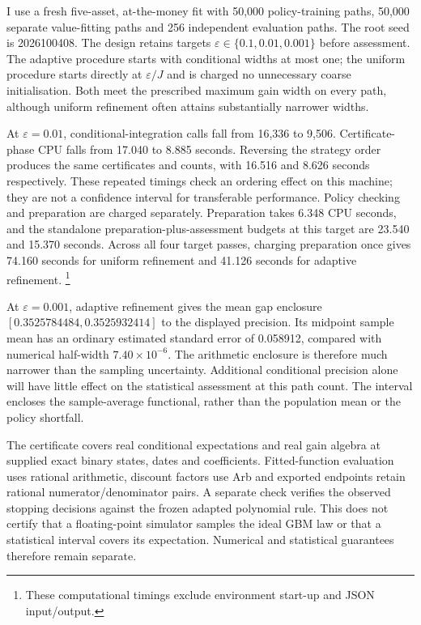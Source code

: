 \documentclass[11pt]{article}
\begin{document}
I use a fresh five-asset, at-the-money fit with 50,000 policy-training paths, 50,000 separate value-fitting paths and 256 independent evaluation paths. The root seed is 2026100408. The design retains targets $\varepsilon\in\{0.1,0.01,0.001\}$ before assessment. The adaptive procedure starts with conditional widths at most one; the uniform procedure starts directly at $\varepsilon/J$ and is charged no unnecessary coarse initialisation. Both meet the prescribed maximum gain width on every path, although uniform refinement often attains substantially narrower widths.

At $\varepsilon=0.01$, conditional-integration calls fall from 16,336 to 9,506. Certificate-phase CPU falls from 17.040 to 8.885 seconds. Reversing the strategy order produces the same certificates and counts, with 16.516 and 8.626 seconds respectively. These repeated timings check an ordering effect on this machine; they are not a confidence interval for transferable performance. Policy checking and preparation are charged separately. Preparation takes 6.348 CPU seconds, and the standalone preparation-plus-assessment budgets at this target are 23.540 and 15.370 seconds. Across all four target passes, charging preparation once gives 74.160 seconds for uniform refinement and 41.126 seconds for adaptive refinement. \footnote{These computational timings exclude environment start-up and JSON input/output.}

At $\varepsilon=0.001$, adaptive refinement gives the mean gap enclosure $[0.3525784484,\allowbreak 0.3525932414]$ to the displayed precision. Its midpoint sample mean has an ordinary estimated standard error of 0.058912, compared with numerical half-width $7.40\times10^{-6}$. The arithmetic enclosure is therefore much narrower than the sampling uncertainty. Additional conditional precision alone will have little effect on the statistical assessment at this path count. The interval encloses the sample-average functional, rather than the population mean or the policy shortfall.

The certificate covers real conditional expectations and real gain algebra at supplied exact binary states, dates and coefficients. Fitted-function evaluation uses rational arithmetic, discount factors use Arb and exported endpoints retain rational numerator/denominator pairs. A separate check verifies the observed stopping decisions against the frozen adapted polynomial rule. This does not certify that a floating-point simulator samples the ideal GBM law or that a statistical interval covers its expectation. Numerical and statistical guarantees therefore remain separate.
\end{document}
